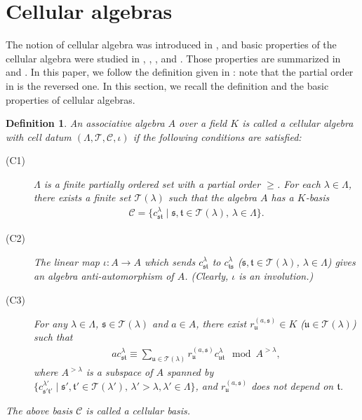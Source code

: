 \documentclass[12pt]{amsart}
\newtheorem{definition}[thm]{Definition}
\numberwithin{equation}{thm}
\newcommand\cC{\mathcal{C}}
\newcommand\cT{\mathcal{T}}
\newcommand\fs{\mathfrak s}
\newcommand\ft{\mathfrak t}
\newcommand\fu{\mathfrak u}
\newcommand\la{\lambda}
\newcommand\vL{\varLambda}
\newcommand\ra{\rightarrow}
\newcounter{ni}
\begin{document}
\section{Cellular algebras} 

The notion of cellular algebra was introduced in \cite{GL},  
and basic properties of the cellular algebra were studied in \cite{GL}, \cite{KX1}, \cite{KX2} \cite{KX3},  \cite{KX4} and \cite{C}. 
Those properties are summarized in \cite{M} and \cite{X}. 
In this paper, we follow the definition given in \cite{M}: note that the partial order in \cite{GL} is the reversed one.
In this section, we recall the definition and the basic properties of cellular algebras.



\begin{definition}
An associative algebra $A$ over a field $K$ is called a \emph{cellular algebra} with cell datum $(\vL, \cT, \cC, \iota)$ 
if the following conditions are satisfied: 
\begin{description}
\item[(C1)] 
$\vL$ is a finite partially ordered set with a partial order $\geq$.  
For each $\la \in \vL$, there exists a finite set $\cT(\la)$ such that
the algebra $A$ has a $K$-basis 
\begin{align*} 
\cC =\{c_{\fs \ft}^{\la} \mid \fs, \ft \in \cT(\la), \, \la \in \vL\}. 
\end{align*}

\item[(C2)] 
The linear map $\iota : A \ra A$ which sends $c_{\fs \ft}^{\la}$ to $c_{\ft \fs}^{\la}$ ($\fs, \ft \in \cT(\la)$, $\la \in \vL$) 
gives an algebra anti-automorphism of $A$. 
(Clearly, $\iota$ is an involution.)

\item[(C3)] 
For any $\la \in \vL$, $\fs \in \cT(\la)$ and $a \in A$, there exist $r_{\fu}^{(a, \fs)} \in K$ ($\fu\in \cT(\la)$) such that 
\begin{align}
\label{C a cst}
a c_{\fs \ft}^{\la} \equiv \sum_{\fu \in\cT(\la)} r_{\fu}^{(a, \fs)} c_{\fu \ft}^{\la} \mod A^{>\la}, 
\end{align}
where $A^{> \la}$ is a subspace of $A$ spanned by 
$\{ c_{\fs' \ft'}^{\la'} \mid \fs', \ft' \in \cT(\la'), \,  \la' > \la, \la' \in \vL\}$, 
and $r_{\fu}^{(a,\fs)}$ does not depend on $\ft$. 
\end{description}
The above basis $\cC$ is called a \emph{cellular basis}. 
\end{definition}
\end{document}
